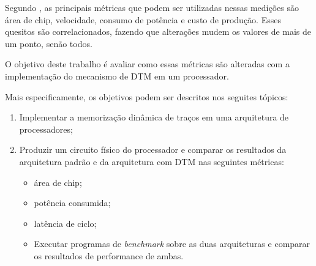Segundo \cite{chu2006rtl}, as principais métricas que podem ser utilizadas nessas medições são área de chip, velocidade, consumo de potência e custo de produção. Esses quesitos são correlacionados, fazendo que alterações mudem os valores de mais de um ponto, senão todos.

O objetivo deste trabalho é avaliar como essas métricas são alteradas com a implementação do mecanismo de DTM em um processador.

Mais especificamente, os objetivos podem ser descritos nos seguites tópicos:
\begin{enumerate}
	\item Implementar a memorização dinâmica de traços em uma arquitetura de processadores;
	\item Produzir um circuito físico do processador e comparar os resultados da arquitetura padrão e da arquitetura com DTM nas seguintes métricas:
	\begin{itemize}
		\item área de chip;
		\item potência consumida;
		\item latência de ciclo;
	\item Executar programas de \textit{benchmark} sobre as duas arquiteturas e comparar os resultados de performance de ambas.
	\end{itemize}
\end{enumerate}
%
%
%
